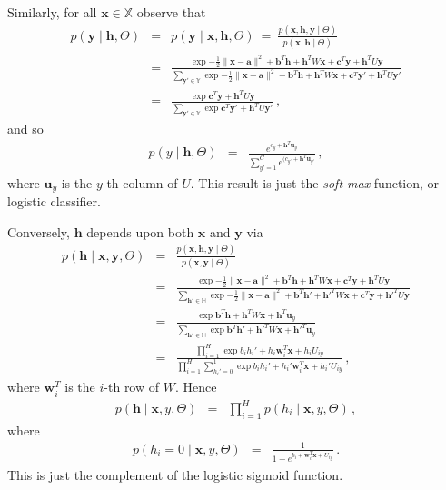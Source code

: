 \documentclass[a4paper]{article}
\newcommand{\v}[1]{\mathbf{#1}}
\begin{document}
Similarly, for all $\v{x}\in\mathbb{X}$ observe that
\begin{eqnarray}
    p(\v{y}\;|\;\v{h},\Theta) & = & p(\v{y}\;|\;\v{x},\v{h},\Theta)
    ~=~\frac{p(\v{x},\v{h},\v{y}\;|\;\Theta)}{p(\v{x},\v{h}\;|\;\Theta)}
\nonumber\\&=&
\frac{
    \exp{-\frac{1}{2}\|\v{x}-\v{a}\|^2+\v{b}^T\v{h}+\v{h}^T W\v{x}+\v{c}^T\v{y}+\v{h}^T U\v{y}}
}
{
    \sum_{\v{y}'\in\mathbb{Y}}
    \exp{-\frac{1}{2}\|\v{x}-\v{a}\|^2+\v{b}^T\v{h}+\v{h}^T W\v{x}+\v{c}^T\v{y}'+\v{h}^T U\v{y}'}
}
\nonumber\\&=&
\frac{
    \exp{\v{c}^T\v{y}+\v{h}^T U\v{y}}
}
{
    \sum_{\v{y}'\in\mathbb{Y}}
    \exp{\v{c}^T\v{y}'+\v{h}^T U\v{y}'}
}
\,,
\end{eqnarray}
and so
\begin{eqnarray}
  p(y\;|\;\v{h},\Theta) & = & \frac{e^{c_y+\v{h}^T\v{u}_y}}
  {\sum_{y'=1}^{C}e^{(c_{y'}+\v{h}^T \v{u}_{y'}}}\,,
\end{eqnarray}
where $\v{u}_y$ is the $y$-th column of $U$.
This result is just the {\em soft-max} function, or logistic classifier.

Conversely, $\v{h}$ depends upon both $\v{x}$ and $\v{y}$ via
\begin{eqnarray}
    p(\v{h}\;|\;\v{x},\v{y},\Theta) & = & 
    \frac{p(\v{x},\v{h},\v{y}\;|\;\Theta)}{p(\v{x},\v{y}\;|\;\Theta)}
\nonumber\\&=&
\frac{
    \exp{-\frac{1}{2}\|\v{x}-\v{a}\|^2+\v{b}^T\v{h}+\v{h}^T W\v{x}+\v{c}^T\v{y}+\v{h}^T U\v{y}}
}
{
    \sum_{\v{h}'\in\mathbb{H}}
    \exp{-\frac{1}{2}\|\v{x}-\v{a}\|^2+\v{b}^T\v{h}'+\v{h}'^T W\v{x}+\v{c}^T\v{y}+\v{h}'^T U\v{y}}
}
\nonumber\\&=&
\frac{
    \exp{\v{b}^T\v{h}+\v{h}^T W\v{x}+\v{h}^T\v{u}_y}
}
{
    \sum_{\v{h}'\in\mathbb{H}}
    \exp{\v{b}^T\v{h}'+\v{h}'^T W\v{x}+\v{h}'^T\v{u}_y}
}
\nonumber\\&=&
\frac{
    \prod_{i=1}^H\exp{b_i h_i'+h_i \v{w}_i^T\v{x}+h_i U_{iy}}
}
{
    \prod_{i=1}^H\sum_{h_i'=0}^{1}
    \exp{b_i h_i'+h_i' \v{w}_i^T\v{x}+h_i' U_{iy}}
}
\,,
\end{eqnarray}
where $\v{w}_i^T$ is the $i$-th row of $W$.
Hence
\begin{eqnarray}
    p(\v{h}\;|\;\v{x},y,\Theta) & = & \prod_{i=1}^H p(h_i\;|\;\v{x},y,\Theta)
\,,
\end{eqnarray}
where 
\begin{eqnarray}
  p(h_i=0\;|\;\v{x},y,\Theta) & = & 
  \frac{1}{1+e^{b_i+\v{w}_i^T\v{x}+U_{iy}}}
  \,.
\end{eqnarray}
This is just the complement of the logistic sigmoid function.
\end{document}
